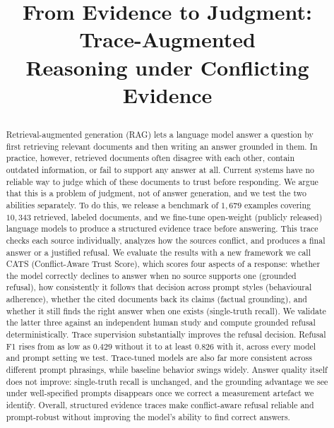 \documentclass{article} %
\title{\raggedright From Evidence to Judgment: Trace-Augmented\\ Reasoning under Conflicting Evidence}
\author{}
\begin{document}
\maketitle
\renewcommand{\thefootnote}{}
\renewcommand{\thefootnote}{\arabic{footnote}}

\begin{abstract}
Retrieval-augmented generation (RAG) lets a language model answer a question by
first retrieving relevant documents and then writing an answer grounded in
them. In practice, however, retrieved documents often disagree with each
other, contain outdated information, or fail to support any answer at all.
Current systems have no reliable way to judge which of these documents to
trust before responding. We argue that this is a problem of judgment,
not of answer generation, and we test the two abilities separately. To do
this, we release a benchmark of $1{,}679$ examples covering $10{,}343$
retrieved, labeled documents, and we fine-tune open-weight (publicly released)
language models to produce a structured evidence trace before
answering. This trace checks each source individually, analyzes how the
sources conflict, and produces a final answer or a justified refusal. We
evaluate the results with a new framework we call CATS
(Conflict-Aware Trust Score), which scores four aspects of a response:
whether the model correctly declines to answer when no source supports one
(grounded refusal), how consistently it follows that decision across prompt
styles (behavioural adherence), whether the cited documents back its claims
(factual grounding), and whether it still finds the right answer when one
exists (single-truth recall). We validate the latter three against an
independent human study and compute grounded refusal deterministically. Trace
supervision substantially improves the refusal decision. Refusal F1
rises from as low as $0.429$ without it to at least $0.826$ with it, across
every model and prompt setting we test. Trace-tuned models are also far more
consistent across different prompt phrasings, while baseline behavior swings
widely. Answer quality itself does not improve: single-truth recall
is unchanged, and the grounding advantage we see under well-specified prompts
disappears once we correct a measurement artefact we identify. Overall,
structured evidence traces make conflict-aware refusal reliable and
prompt-robust without improving the model's ability to find correct answers.
\end{abstract}
\end{document}
